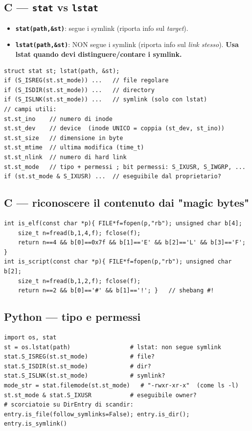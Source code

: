 \documentclass[10pt,a4paper]{article}
\newcommand{\fn}[1]{\texttt{\textbf{#1}}}
\begin{document}
\subsection{C --- \fn{stat} vs \fn{lstat}}
\begin{itemize}
\item \fn{stat(path,\&st)}: segue i symlink (riporta info sul \emph{target}).
\item \fn{lstat(path,\&st)}: NON segue i symlink (riporta info sul \emph{link stesso}). \textbf{Usa lstat quando devi distinguere/contare i symlink.}
\end{itemize}
\begin{lstlisting}[style=c]
struct stat st; lstat(path, &st);
if (S_ISREG(st.st_mode)) ...   // file regolare
if (S_ISDIR(st.st_mode)) ...   // directory
if (S_ISLNK(st.st_mode)) ...   // symlink (solo con lstat)
// campi utili:
st.st_ino    // numero di inode
st.st_dev    // device  (inode UNICO = coppia (st_dev, st_ino))
st.st_size   // dimensione in byte
st.st_mtime  // ultima modifica (time_t)
st.st_nlink  // numero di hard link
st.st_mode   // tipo + permessi ; bit permessi: S_IXUSR, S_IWGRP, ...
if (st.st_mode & S_IXUSR) ...  // eseguibile dal proprietario?
\end{lstlisting}

\subsection{C --- riconoscere il contenuto dai "magic bytes"}
\begin{lstlisting}[style=c]
int is_elf(const char *p){ FILE*f=fopen(p,"rb"); unsigned char b[4];
    size_t n=fread(b,1,4,f); fclose(f);
    return n==4 && b[0]==0x7f && b[1]=='E' && b[2]=='L' && b[3]=='F'; }
int is_script(const char *p){ FILE*f=fopen(p,"rb"); unsigned char b[2];
    size_t n=fread(b,1,2,f); fclose(f);
    return n==2 && b[0]=='#' && b[1]=='!'; }   // shebang #!
\end{lstlisting}

\subsection{Python --- tipo e permessi}
\begin{lstlisting}[style=py]
import os, stat
st = os.lstat(path)                 # lstat: non segue symlink
stat.S_ISREG(st.st_mode)            # file?
stat.S_ISDIR(st.st_mode)            # dir?
stat.S_ISLNK(st.st_mode)            # symlink?
mode_str = stat.filemode(st.st_mode)   # "-rwxr-xr-x"  (come ls -l)
st.st_mode & stat.S_IXUSR           # eseguibile owner?
# scorciatoie su DirEntry di scandir:
entry.is_file(follow_symlinks=False); entry.is_dir(); entry.is_symlink()
\end{lstlisting}
\end{document}
